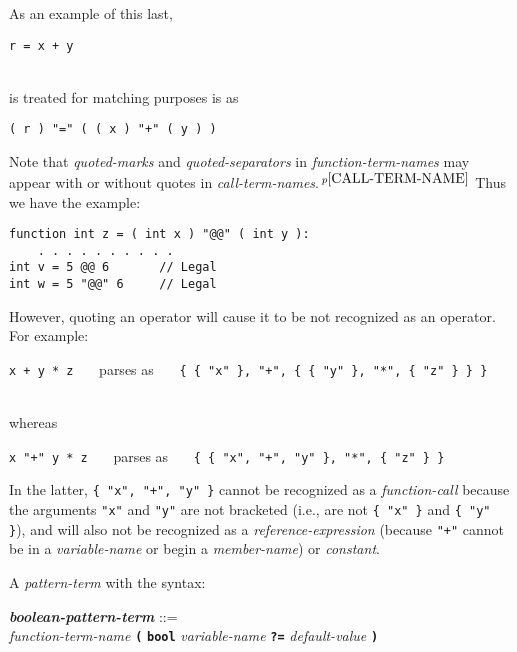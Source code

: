 \documentclass[12pt]{article}
\newcommand{\TT}[1]{{\tt \bfseries #1}}
\newcommand{\emkey}[1]{{\em \bfseries #1}}
\newcommand{\pagnote}[1]{$\,^{p\pageref{#1}}$}
\newenvironment{indpar}[1][0.3in]%
	{\begin{list}{}%
		     {\setlength{\itemsep}{0in}%
		      \setlength{\topsep}{0in}%
		      \setlength{\parsep}{1ex}%
		      \setlength{\labelwidth}{#1}%
		      \setlength{\leftmargin}{#1}%
		      \addtolength{\leftmargin}{\labelsep}}%
	 \item}%
	{\end{list}}
\begin{document}
As an example of this last,
\\[0.5ex]
\centerline{
{\tt r = x + y}
}
\\
is treated for matching purposes is as
\\[1ex]
\centerline{
{\tt ( r ) "=" ( ( x ) "+" ( y ) )}
}

Note that {\em quoted-marks} and {\em quoted-separators}
in {\em function-term-names} may appear with or without quotes in
{\em call-term-names}.\pagnote{CALL-TERM-NAME}  Thus we have the example:
\begin{indpar}\begin{verbatim}
function int z = ( int x ) "@@" ( int y ):
    . . . . . . . . . .
int v = 5 @@ 6       // Legal
int w = 5 "@@" 6     // Legal
\end{verbatim}\end{indpar}

However, quoting an operator will cause it to be not recognized as
an operator.  For example:
\\[0.5ex]
\centerline{
{\tt x + y * z}
~~~parses as~~~
{\tt \{ \{ "x" \}, "+", \{ \{ "y" \}, "*", \{ "z" \} \} \}} \\
} \\
whereas \\
\centerline{
{\tt x "+" y * z}
~~~parses as~~~
{\tt \{ \{ "x", "+", "y" \}, "*", \{ "z" \} \}}
}
In the latter, {\tt \{ "x", "+", "y" \}} cannot be recognized as
a {\em function-call} because the arguments {\tt "x"} and {\tt "y"} are
not bracketed (i.e., are not {\tt \{ "x" \}} and {\tt \{ "y" \}}),
and will also not be recognized as a {\em reference-expression}
(because {\tt "+"} cannot be in a {\em variable-name} or
begin a {\em member-name}) or
{\em constant}.

A {\em pattern-term} with the syntax:
\begin{indpar}
\emkey{boolean-pattern-term}\label{BOOLEAN-PATTERN-TERM} ::= \\
\hspace*{1in} {\em function-term-name} \TT{(}
        \TT{bool} {\em variable-name}
	\TT{?=} {\em default-value} \TT{)}
\end{indpar}
\end{document}
